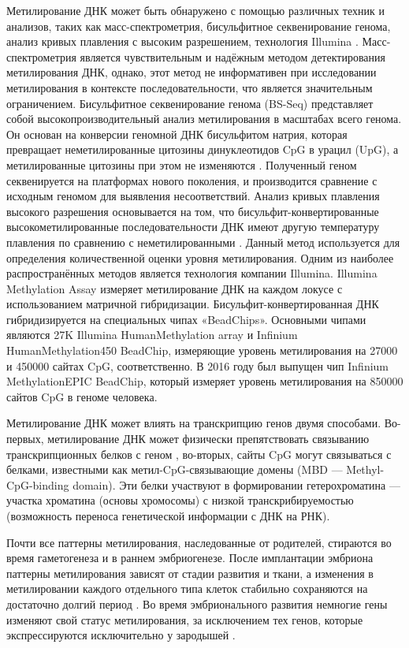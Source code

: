 Метилирование ДНК может быть обнаружено с помощью различных техник и анализов, таких как масс-спектрометрия, бисульфитное секвенирование генома, анализ кривых плавления с высоким разрешением, технология Illumina \autocite{Rana2018}. Масс-спектрометрия является чувствительным и надёжным методом детектирования метилирования ДНК, однако, этот метод не информативен при исследовании метилирования в контексте последовательности, что является значительным ограничением. Бисульфитное секвенирование генома (BS-Seq) представляет собой высокопроизводительный анализ метилирования в масштабах всего генома. Он основан на конверсии геномной ДНК бисульфитом натрия, которая превращает неметилированные цитозины динуклеотидов CpG в урацил (UpG), а метилированные цитозины при этом не изменяются \autocite{Hernandez2013}. Полученный геном секвенируется на платформах нового поколения, и производится сравнение с исходным геномом для выявления несоответствий. Анализ кривых плавления высокого разрешения основывается на том, что бисульфит-конвертированные высокометилированные последовательности ДНК имеют другую температуру плавления по сравнению с неметилированными \autocite{Malentacchi2009}. Данный метод используется для определения количественной оценки уровня метилирования. Одним из наиболее распространённых методов является технология компании Illumina. Illumina Methylation Assay измеряет метилирование ДНК на каждом локусе с использованием матричной гибридизации. Бисульфит-конвертированная ДНК гибридизируется на специальных чипах «BeadChips». Основными чипами являются 27K Illumina HumanMethylation array и Infinium HumanMethylation450 BeadChip, измеряющие уровень метилирования на 27000 и 450000 сайтах CpG, соответственно. В 2016 году был выпущен чип Infinium MethylationEPIC BeadChip, который измеряет уровень метилирования на 850000 сайтов CpG в геноме человека.

Метилирование ДНК может влиять на транскрипцию генов двумя способами. Во-первых, метилирование ДНК может физически препятствовать связыванию транскрипционных белков с геном \autocite{Choy2010}, во-вторых, сайты CpG могут связываться с белками, известными как метил-CpG-связывающие домены (MBD --- Methyl-CpG-binding domain). Эти белки участвуют в формировании гетерохроматина --- участка хроматина (основы хромосомы) с низкой транскрибируемостью (возможность переноса генетической информации с ДНК на РНК). 

Почти все паттерны метилирования, наследованные от родителей, стираются во время гаметогенеза и в раннем эмбриогенезе. После имплантации эмбриона паттерны метилирования зависят от стадии развития и ткани, а изменения в метилировании каждого отдельного типа клеток стабильно сохраняются на достаточно долгий период \autocite{Cedar2012}. Во время эмбрионального развития немногие гены изменяют свой статус метилирования, за исключением тех генов, которые экспрессируются исключительно у зародышей \autocite{Borgel2010}.

